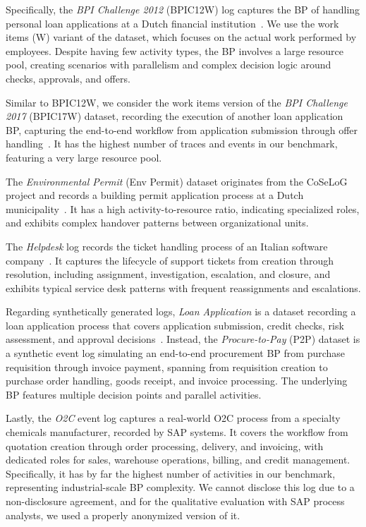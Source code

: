 \documentclass[preprint,12pt]{elsarticle}
\begin{document}
Specifically, the \textit{BPI Challenge 2012} (BPIC12W) log captures the BP of handling personal loan applications at a Dutch financial institution~\citep{https://doi.org/10.4121/uuid:3926db30-f712-4394-aebc-75976070e91f}. We use the work items (W) variant of the dataset, which focuses on the actual work performed by employees. Despite having few activity types, the BP involves a large resource pool, creating scenarios with parallelism and complex decision logic around checks, approvals, and offers.

Similar to BPIC12W, we consider the work items version of the \textit{BPI Challenge 2017} (BPIC17W) dataset, recording the execution of another loan application BP, capturing the end-to-end workflow from application submission through offer handling~\citep{https://doi.org/10.4121/14625948.v1}. It has the highest number of traces and events in our benchmark, featuring a very large resource pool.

The \textit{Environmental Permit} (Env Permit) dataset originates from the CoSeLoG project and records a building permit application process at a Dutch municipality~\citep{https://doi.org/10.4121/uuid:c45dcbe9-557b-43ca-b6d0-10561e13dcb5}. It has a high activity-to-resource ratio, indicating specialized roles, and exhibits complex handover patterns between organizational units.

The \textit{Helpdesk} log records the ticket handling process of an Italian software company~\citep{https://doi.org/10.4121/uuid:0c60edf1-6f83-4e75-9367-4c63b3e9d5bb}. It captures the lifecycle of support tickets from creation through resolution, including assignment, investigation, escalation, and closure, and exhibits typical service desk patterns with frequent reassignments and escalations.

Regarding synthetically generated logs, \textit{Loan Application} is a dataset recording a loan application process that covers application submission, credit checks, risk assessment, and approval decisions~\citep{https://doi.org/10.4121/uuid:cdf3ba31-291d-468d-9712-3a58ac6da3fc}. Instead, the \textit{Procure-to-Pay} (P2P) dataset is a synthetic event log simulating an end-to-end procurement BP from purchase requisition through invoice payment, spanning from requisition creation to purchase order handling, goods receipt, and invoice processing. The underlying BP features multiple decision points and parallel activities.

Lastly, the \textit{O2C} event log captures a real-world O2C process from a specialty chemicals manufacturer, recorded by SAP systems. It covers the workflow from quotation creation through order processing, delivery, and invoicing, with dedicated roles for sales, warehouse operations, billing, and credit management. Specifically, it has by far the highest number of activities in our benchmark, representing industrial-scale BP complexity. We cannot disclose this log due to a non-disclosure agreement, and for the qualitative evaluation with SAP process analysts, we used a properly anonymized version of it.
\end{document}
